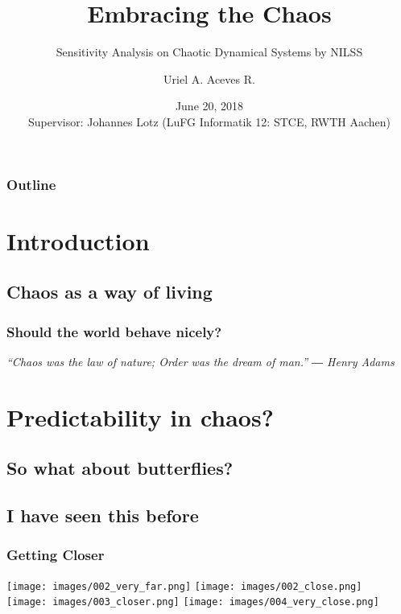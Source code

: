 \documentclass{beamer}
\title{Embracing the Chaos}
\subtitle{Sensitivity Analysis on Chaotic Dynamical Systems by NILSS}
\author{Uriel A. Aceves R.}
\date{June 20, 2018\\ \vspace{0.3cm}
Supervisor: Johannes Lotz (LuFG Informatik 12: STCE, RWTH Aachen)}
\institute{\url{uriel.aceves@rwth-aachen.de}}
\begin{document}
\begin{frame}[plain,t]
\titlepage
\end{frame}

\begin{frame}%
	\frametitle{Outline}
  \begin{footnotesize}
\tableofcontents
\end{footnotesize}
\end{frame}

\section{Introduction}
  \subsection{Chaos as a way of living}

\begin{frame}
  \frametitle{Should the world behave nicely?}
  \textit{
  “Chaos was the law of nature; Order was the dream of man.”
  ― Henry Adams}

\end{frame}

\section{Predictability in chaos?}
\subsection{So what about butterflies?}
\subsection{I have seen this before}
  \begin{frame}
    \frametitle{Getting Closer}
    \begin{center}
    \texttt{[image: images/002\_very\_far.png]}
    \texttt{[image: images/002\_close.png]}\\

    \texttt{[image: images/003\_closer.png]}
    \texttt{[image: images/004\_very\_close.png]}
  \end{center}
  \end{frame}
\end{document}
